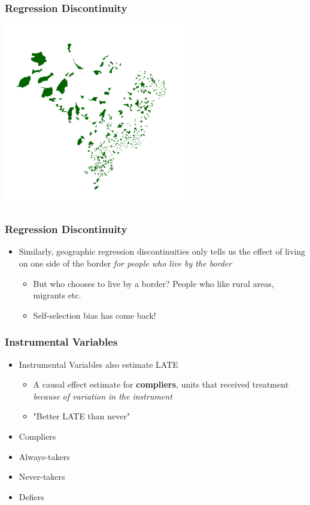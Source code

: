 \documentclass[xcolor=x11names,compress]{beamer}\usepackage[]{graphicx}\usepackage[]{xcolor}
\renewcommand{\(}{\begin{columns}}
\renewcommand{\)}{\end{columns}}
\newcommand{\<}[1]{\begin{column}{#1}}
\renewcommand{\>}{\end{column}}
\begin{document}
\begin{frame}
\frametitle{Regression Discontinuity}
\includegraphics[width=0.6\textwidth]{rd_LATE_map.png}
\end{frame}

\begin{frame}
\frametitle{Regression Discontinuity}
\begin{itemize}
\item Similarly, geographic regression discontinuities only tells us the effect of living on one side of the border \textit{for people who live by the border}
\pause
\begin{itemize}
\item But who chooses to live by a border? People who like rural areas, migrants etc.
\pause
\item Self-selection bias has come back!
\end{itemize}
\end{itemize}
\end{frame}

\begin{frame}
\frametitle{Instrumental Variables}
\begin{itemize}
\item Instrumental Variables also estimate LATE
\begin{itemize}
\item A causal effect estimate for \textbf{compliers}, units that received treatment \textit{because of variation in the instrument}
\item "Better LATE than never"
\end{itemize}
\item Compliers
\item Always-takers
\item Never-takers
\item Defiers
\end{itemize}
\end{frame}
\end{document}
